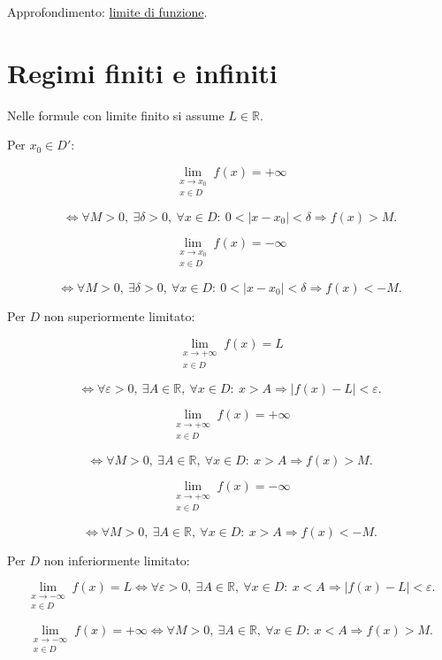Approfondimento: \href{https://ingegnerismo.it/matematica/limite-di-funzione/}{limite di funzione}.

\section{Regimi finiti e infiniti}\label{regimi-finiti-e-infiniti}

Nelle formule con limite finito si assume \(L\in\mathbb R\).

Per \(x_0\in D'\):

\[
\lim_{\substack{x\to x_0\\x\in D}}f(x)=+\infty
\]

\[
\Longleftrightarrow
\forall M>0,\ \exists\delta>0,\ \forall x\in D:\
0<|x-x_0|<\delta
\Rightarrow
f(x)>M.
\]

\[
\lim_{\substack{x\to x_0\\x\in D}}f(x)=-\infty
\]

\[
\Longleftrightarrow
\forall M>0,\ \exists\delta>0,\ \forall x\in D:\
0<|x-x_0|<\delta
\Rightarrow
f(x)<-M.
\]

Per \(D\) non superiormente limitato:

\[
\lim_{\substack{x\to+\infty\\x\in D}}f(x)=L
\]

\[
\Longleftrightarrow
\forall\varepsilon>0,\ \exists A\in\mathbb R,\ \forall x\in D:\
x>A\Rightarrow|f(x)-L|<\varepsilon.
\]

\[
\lim_{\substack{x\to+\infty\\x\in D}}f(x)=+\infty
\]

\[
\Longleftrightarrow
\forall M>0,\ \exists A\in\mathbb R,\ \forall x\in D:\
x>A\Rightarrow f(x)>M.
\]

\[
\lim_{\substack{x\to+\infty\\x\in D}}f(x)=-\infty
\]

\[
\Longleftrightarrow
\forall M>0,\ \exists A\in\mathbb R,\ \forall x\in D:\
x>A\Rightarrow f(x)<-M.
\]

Per \(D\) non inferiormente limitato:

\[
\lim_{\substack{x\to-\infty\\x\in D}}f(x)=L
\Longleftrightarrow
\forall\varepsilon>0,\ \exists A\in\mathbb R,\ \forall x\in D:\
x<A\Rightarrow|f(x)-L|<\varepsilon.
\]

\[
\lim_{\substack{x\to-\infty\\x\in D}}f(x)=+\infty
\Longleftrightarrow
\forall M>0,\ \exists A\in\mathbb R,\ \forall x\in D:\
x<A\Rightarrow f(x)>M.
\]

